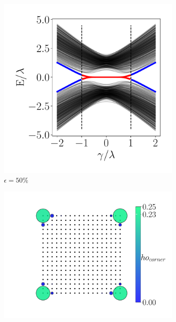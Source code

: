 \begin{figure}[thb!]
\begin{minipage}{0.8\textwidth}
\begin{minipage}[h!]{0.8\textwidth}
\begin{subfigure}[b!]{0.56 \textwidth}
                \end{subfigure}\hspace*{-0.5em}
            \end{minipage}\vspace*{-1.5em}
            
            \begin{minipage}[h!]{0.8\textwidth}
                \begin{subfigure}[b!]{0.44 \textwidth}
                    \caption{$\epsilon = 50\%$}
                    \includegraphics[width=\textwidth]{Imagenes/Resultados_Hoti_Cuadrado/bands_square_shh_0.5.pdf}
                \end{subfigure}\hspace*{-0.5em}
                \begin{subfigure}[b!]{0.56 \textwidth}
                    \caption*{}
                    \includegraphics[width=\textwidth]{Imagenes/Resultados_Hoti_Cuadrado/proyection_square_0.5.pdf}

\end{subfigure}
\end{minipage}
\end{minipage}
\end{figure}
